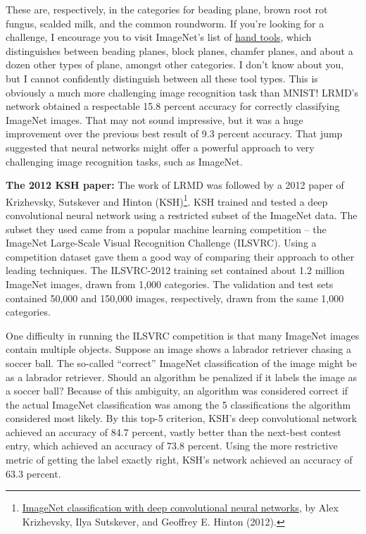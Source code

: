 \documentclass[a4paper,twoside,10pt]{book}
\begin{document}
These are, respectively, in the categories for beading plane, brown root rot fungus, scalded milk, and the common roundworm. If you're looking for a challenge, I encourage you to visit ImageNet's list of \href{http://www.image-net.org/synset?wnid=n03489162}{hand tools}, which distinguishes between beading planes, block planes, chamfer planes, and about a dozen other types of plane, amongst other categories. I don't know about you, but I cannot confidently distinguish between all these tool types. This is obviously a much more challenging image recognition task than MNIST! LRMD's network obtained a respectable 15.8 percent accuracy for correctly classifying ImageNet images. That may not sound impressive, but it was a huge improvement over the previous best result of 9.3 percent accuracy. That jump suggested that neural networks might offer a powerful approach to very challenging image recognition tasks, such as ImageNet.

\textbf{The 2012 KSH paper:} The work of LRMD was followed by a 2012 paper of Krizhevsky, Sutskever and Hinton (KSH)\footnote{\href{http://www.cs.toronto.edu/~fritz/absps/imagenet.pdf}{ImageNet classification with deep convolutional neural networks}, by Alex Krizhevsky, Ilya Sutskever, and Geoffrey E. Hinton (2012).}. KSH trained and tested a deep convolutional neural network using a restricted subset of the ImageNet data. The subset they used came from a popular machine learning competition -- the ImageNet Large-Scale Visual Recognition Challenge (ILSVRC). Using a competition dataset gave them a good way of comparing their approach to other leading techniques. The ILSVRC-2012 training set contained about 1.2 million ImageNet images, drawn from 1,000 categories. The validation and test sets contained 50,000 and 150,000 images, respectively, drawn from the same 1,000 categories.

One difficulty in running the ILSVRC competition is that many ImageNet images contain multiple objects. Suppose an image shows a labrador retriever chasing a soccer ball. The so-called ``correct'' ImageNet classification of the image might be as a labrador retriever. Should an algorithm be penalized if it labels the image as a soccer ball? Because of this ambiguity, an algorithm was considered correct if the actual ImageNet classification was among the 5 classifications the algorithm considered most likely. By this top-5 criterion, KSH's deep convolutional network achieved an accuracy of 84.7 percent, vastly better than the next-best contest entry, which achieved an accuracy of 73.8 percent. Using the more restrictive metric of getting the label exactly right, KSH's network achieved an accuracy of 63.3 percent.
\end{document}
